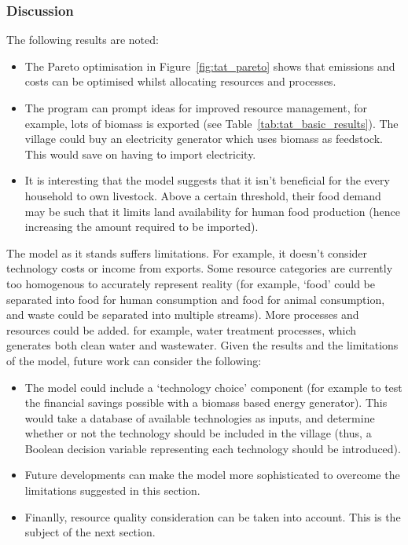 \subsubsection*{Discussion}
The following results are noted:
\begin{itemize}
	\item The Pareto optimisation in Figure~\ref{fig:tat_pareto} shows that emissions and costs can be optimised whilst allocating resources and processes.
	\item The program can prompt ideas for improved resource management, for example, lots of biomass is exported (see Table~\ref{tab:tat_basic_results}). The village could buy an electricity generator which uses biomass as feedstock. This would save on having to import electricity.
	\item It is interesting that the model suggests that it isn't beneficial for the every household to own livestock. Above a certain threshold, their food demand may be such that it limits land availability for human food production (hence increasing the amount required to be imported).
\end{itemize}	
The model as it stands suffers limitations. For example, it doesn't consider technology costs or income from exports. Some resource categories are currently too homogenous to accurately represent reality (for example, `food' could be separated into food for human consumption and food for animal consumption, and waste could be separated into multiple streams). More processes and resources could be added. for example, water treatment processes, which generates both clean water and wastewater. Given the results and the limitations of the model, future work can consider the following:
\begin{itemize}
	\item The model could include a `technology choice' component (for example to test the financial savings possible with a biomass based energy generator). This would take a database of available technologies as inputs, and determine whether or not the technology should be included in the village (thus, a Boolean decision variable representing each technology should be introduced).
	\item Future developments can make the model more sophisticated to overcome the limitations suggested in this section.
	\item Finanlly, resource quality consideration can be taken into account. This is the subject of the next section.
\end{itemize}

